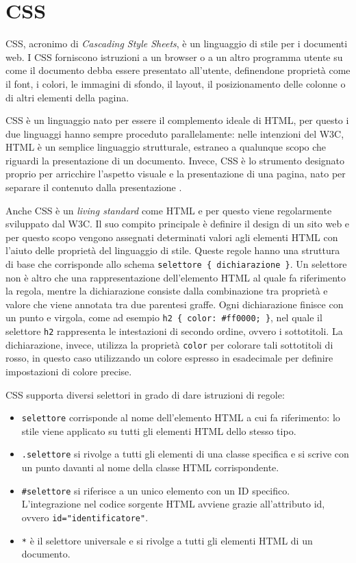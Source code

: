 \section{CSS}
CSS, acronimo di \textit{Cascading Style Sheets}, è un linguaggio di stile per i documenti web. I CSS forniscono istruzioni a un browser o a un altro programma utente su come il documento debba essere presentato all'utente, definendone proprietà come il font, i colori, le immagini di sfondo, il layout, il posizionamento delle colonne o di altri elementi della pagina.

CSS è un linguaggio nato per essere il complemento ideale di HTML, per questo i due linguaggi hanno sempre proceduto parallelamente: nelle intenzioni del W3C, HTML è un semplice linguaggio strutturale, estraneo a qualunque scopo che riguardi la presentazione di un documento. Invece, CSS è lo strumento designato proprio per arricchire l'aspetto visuale e la presentazione di una pagina, nato per separare il contenuto dalla presentazione \cite{CSS_Introduzione}.

Anche CSS è un \textit{living standard} come HTML e per questo viene regolarmente sviluppato dal W3C. Il suo compito principale è definire il design di un sito web e per questo scopo vengono assegnati determinati valori agli elementi HTML con l'aiuto delle proprietà del linguaggio di stile. Queste regole hanno una struttura di base che corrisponde allo schema \Verb_selettore { dichiarazione }_. Un selettore non è altro che una rappresentazione dell'elemento HTML al quale fa riferimento la regola, mentre la dichiarazione consiste dalla combinazione tra proprietà e valore che viene annotata tra due parentesi graffe. Ogni dichiarazione finisce con un punto e virgola, come ad esempio \Verb_h2 { color: #ff0000; }_, nel quale il selettore \Verb_h2_ rappresenta le intestazioni di secondo ordine, ovvero i sottotitoli. La dichiarazione, invece, utilizza la proprietà \Verb_color_ per colorare tali sottotitoli di rosso, in questo caso utilizzando un colore espresso in esadecimale per definire impostazioni di colore precise.

CSS supporta diversi selettori in grado di dare istruzioni di regole:
\begin{itemize}
    \item \Verb_selettore_ corrisponde al nome dell'elemento HTML a cui fa riferimento: lo stile viene applicato su tutti gli elementi HTML dello stesso tipo.
    \item \Verb_.selettore_ si rivolge a tutti gli elementi di una classe specifica e si scrive con un punto davanti al nome della classe HTML corrispondente.
    \item \Verb_#selettore_ si riferisce a un unico elemento con un ID specifico. L'integrazione nel codice sorgente HTML avviene grazie all'attributo id, ovvero \Verb_id="identificatore"_.
    \item \Verb_*_ è il selettore universale e si rivolge a tutti gli elementi HTML di un documento.
\end{itemize}

